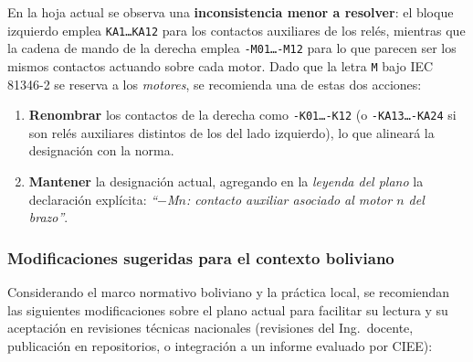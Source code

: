 \documentclass[11pt]{article}
\begin{document}
\begin{observa}
	En la hoja actual se observa una \textbf{inconsistencia menor a
		resolver}: el bloque izquierdo emplea \texttt{KA1\dots KA12} para los
	contactos auxiliares de los relés, mientras que la cadena de mando de
	la derecha emplea \texttt{-M01\dots-M12} para lo que parecen ser los
	mismos contactos actuando sobre cada motor. Dado que la letra
	\texttt{M} bajo IEC 81346-2 se reserva a los \emph{motores}, se
	recomienda una de estas dos acciones:
	
	\begin{enumerate}[label=(\alph*),leftmargin=1.6em]
		\item \textbf{Renombrar} los contactos de la derecha como
		\texttt{-K01\dots-K12} (o \texttt{-KA13\dots-KA24} si son relés
		auxiliares distintos de los del lado izquierdo), lo que
		alineará la designación con la norma.
		\item \textbf{Mantener} la designación actual, agregando en la
		\emph{leyenda del plano} la declaración explícita:
		\emph{``$-$M$n$: contacto auxiliar asociado al motor $n$
			del brazo''}.
	\end{enumerate}
\end{observa}

\subsubsection*{Modificaciones sugeridas para el contexto boliviano}

Considerando el marco normativo boliviano y la práctica local, se
recomiendan las siguientes modificaciones sobre el plano actual para
facilitar su lectura y su aceptación en revisiones técnicas nacionales
(revisiones del Ing.\ docente, publicación en repositorios, o
integración a un informe evaluado por CIEE):
\end{document}
